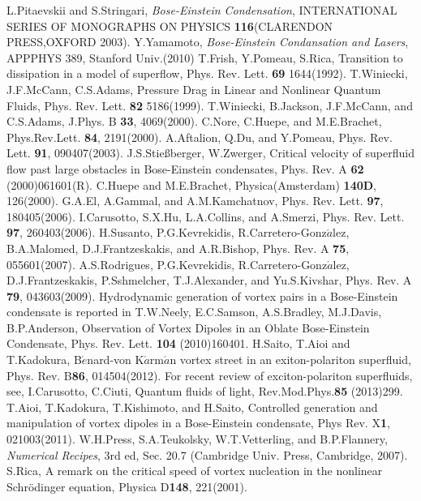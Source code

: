 \documentclass[12pt,a4paper]{report} %
\begin{document}
\begin{thebibliography}{81}
 L.Pitaevskii and S.Stringari, {\it Bose-Einstein Condensation}, INTERNATIONAL SERIES OF MONOGRAPHS ON PHYSICS {\bf 116}(CLARENDON PRESS,OXFORD 2003).
 Y.Yamamoto, {\it Bose-Einstein Condansation and Lasers}, APPPHYS 389, Stanford Univ.(2010)
 T.Frish, Y.Pomeau, S.Rica, Transition to dissipation in a model of superflow, Phys. Rev. Lett. {\bf 69} 1644(1992).
 T.Winiecki, J.F.McCann, C.S.Adams, Pressure Drag in Linear and Nonlinear Quantum Fluids, Phys. Rev. Lett. {\bf 82} 5186(1999).
 T.Winiecki, B.Jackson, J.F.McCann, and C.S.Adams, J.Phys. B {\bf 33}, 4069(2000).
 C.Nore, C.Huepe, and M.E.Brachet, Phys.Rev.Lett. {\bf 84}, 2191(2000).
 A.Aftalion, Q.Du, and Y.Pomeau, Phys. Rev. Lett. {\bf 91}, 090407(2003).
 J.S.Stie\ss berger, W.Zwerger, Critical velocity of superfluid flow past large obstacles in Bose-Einstein condensates, Phys. Rev. A {\bf 62} (2000)061601(R).
 C.Huepe and M.E.Brachet, Physica(Amsterdam) {\bf 140D}, 126(2000).
 G.A.El, A.Gammal, and A.M.Kamchatnov, Phys. Rev. Lett. {\bf 97}, 180405(2006).
 I.Carusotto, S.X.Hu, L.A.Collins, and A.Smerzi, Phys. Rev. Lett. {\bf 97}, 260403(2006).
 H.Susanto, P.G.Kevrekidis, R.Carretero-Gonz$\acute{a}$lez, B.A.Malomed, D.J.Frantzeskakis, and A.R.Bishop, Phys. Rev. A {\bf 75}, 055601(2007).
 A.S.Rodrigues, P.G.Kevrekidis, R.Carretero-Gonz$\acute{a}$lez, D.J.Frantzeskakis, P.Sshmelcher, T.J.Alexander, and Yu.S.Kivshar, Phys. Rev. A {\bf 79}, 043603(2009).
 Hydrodynamic generation of vortex pairs in a Bose-Einstein condensate is reported in T.W.Neely, E.C.Samson, A.S.Bradley, M.J.Davis, B.P.Anderson, Observation of Vortex Dipoles in an Oblate Bose-Einstein Condensate, Phys. Rev. Lett. {\bf 104} (2010)160401.
 H.Saito, T.Aioi and T.Kadokura, B$\acute{e}$nard-von K$\acute{a}$rm$\acute{a}$n vortex street in an exiton-polariton superfluid, Phys. Rev. B{\bf 86}, 014504(2012).
 For recent review of exciton-polariton superfluids, see, I.Carusotto, C.Ciuti, Quantum fluids of light, Rev.Mod.Phys.{\bf 85} (2013)299.
 T.Aioi, T.Kadokura, T.Kishimoto, and H.Saito, Controlled generation and manipulation of vortex dipoles in a Bose-Einstein condensate, Phys Rev. X{\bf 1}, 021003(2011).
 W.H.Press, S.A.Teukolsky, W.T.Vetterling, and B.P.Flannery, {\it Numerical Recipes}, 3rd ed, Sec. 20.7 (Cambridge Univ. Press, Cambridge, 2007).
 S.Rica, A remark on the critical speed of vortex nucleation in the nonlinear Schr\"{o}dinger equation, Physica D{\bf 148}, 221(2001).

\end{thebibliography}
\end{document}
